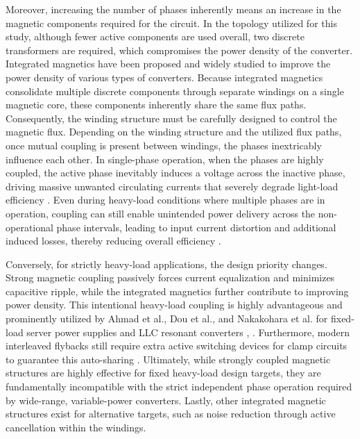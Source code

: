 \documentclass[lettersize,journal]{IEEEtran}
\begin{document}
Moreover, increasing the number of phases inherently means an increase in the magnetic components required for the circuit. In the topology utilized for this study, although fewer active components are used overall, two discrete transformers are required, which compromises the power density of the converter. Integrated magnetics have been proposed and widely studied to improve the power density of various types of converters. Because integrated magnetics consolidate multiple discrete components through separate windings on a single magnetic core, these components inherently share the same flux paths. Consequently, the winding structure must be carefully designed to control the magnetic flux. Depending on the winding structure and the utilized flux paths, once mutual coupling is present between windings, the phases inextricably influence each other. In single-phase operation, when the phases are highly coupled, the active phase inevitably induces a voltage across the inactive phase, driving massive unwanted circulating currents that severely degrade light-load efficiency \cite{Yang_2020, Z_Li_2025}. Even during heavy-load conditions where multiple phases are in operation, coupling can still enable unintended power delivery across the non-operational phase intervals, leading to input current distortion and additional induced losses, thereby reducing overall efficiency \cite{Yang_2020}.

Conversely, for strictly heavy-load applications, the design priority changes. Strong magnetic coupling passively forces current equalization and minimizes capacitive ripple, while the integrated magnetics further contribute to improving power density. This intentional heavy-load coupling is highly advantageous and prominently utilized by Ahmad et al., Dou et al., and Nakakohara et al. for fixed-load server power supplies and LLC resonant converters \cite{Ahmad}, \cite{Dou, Nakakohara}. Furthermore, modern interleaved flybacks still require extra active switching devices for clamp circuits to guarantee this auto-sharing \cite{Z_Chen_s42835}. Ultimately, while strongly coupled magnetic structures are highly effective for fixed heavy-load design targets, they are fundamentally incompatible with the strict independent phase operation required by wide-range, variable-power converters. Lastly, other integrated magnetic structures exist for alternative targets, such as noise reduction through active cancellation within the windings.
\end{document}
